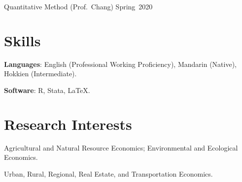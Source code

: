 \documentclass[11pt,letterpaper]{article}
\begin{document}
Quantitative Method (Prof.~Chang) \hfill \mbox{Spring 2020}

\hypertarget{skills}{%
\section{Skills}\label{skills}}

\textbf{Languages}: English (Professional Working Proficiency), Mandarin (Native), Hokkien (Intermediate).

\textbf{Software}: R, Stata, \LaTeX.

\hypertarget{research-interests}{%
\section{Research Interests}\label{research-interests}}

Agricultural and Natural Resource Economics; Environmental and Ecological Economics.

Urban, Rural, Regional, Real Estate, and Transportation Economics.
\end{document}
